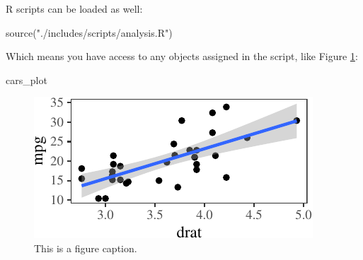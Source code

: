 \documentclass[a4paper,11pt,twocolumn]{article}
\newenvironment{Shaded}{\begin{snugshade}}{\end{snugshade}}
\newcommand{\KeywordTok}[1]{\textcolor[rgb]{0.94,0.87,0.69}{#1}}
\newcommand{\NormalTok}[1]{\textcolor[rgb]{0.80,0.80,0.80}{#1}}
\newcommand{\StringTok}[1]{\textcolor[rgb]{0.80,0.58,0.58}{#1}}
\begin{document}
R scripts can be loaded as well:

\begin{Shaded}
\begin{Highlighting}[]
\KeywordTok{source}\NormalTok{(}\StringTok{"./includes/scripts/analysis.R"}\NormalTok{)}
\end{Highlighting}
\end{Shaded}

Which means you have access to any objects assigned in the script, like
Figure \ref{fig:ex_plot}:

\begin{Shaded}
\begin{Highlighting}[]
\NormalTok{cars_plot}
\end{Highlighting}
\end{Shaded}

\begin{figure}[!h]
\caption{This is a figure caption.}\label{fig:ex_plot}


\begin{center}\includegraphics{master_files/figure-latex/ex_plot-1} \end{center}

\end{figure}




\theendnotes
\end{document}
